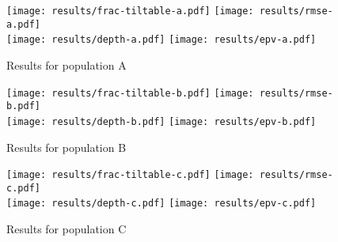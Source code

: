 \begin{figure}
    \texttt{[image: results/frac-tiltable-a.pdf]}%
    \texttt{[image: results/rmse-a.pdf]}\\
    \texttt{[image: results/depth-a.pdf]}%
    \texttt{[image: results/epv-a.pdf]}%
    \caption[Pop. A]{Results for population A}%
    \label{fig:results-a}
\end{figure}

\begin{figure}
    \texttt{[image: results/frac-tiltable-b.pdf]}%
    \texttt{[image: results/rmse-b.pdf]}\\
    \texttt{[image: results/depth-b.pdf]}%
    \texttt{[image: results/epv-b.pdf]}%
    \caption[Pop. B]{Results for population B}%
    \label{fig:results-b}
\end{figure}

\begin{figure}
    \texttt{[image: results/frac-tiltable-c.pdf]}%
    \texttt{[image: results/rmse-c.pdf]}\\
    \texttt{[image: results/depth-c.pdf]}%
    \texttt{[image: results/epv-c.pdf]}%
    \caption[Pop. C]{Results for population C}%
    \label{fig:results-c}
\end{figure}


